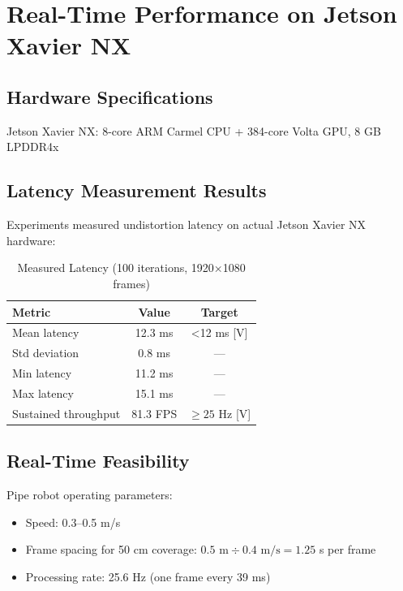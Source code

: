 \documentclass[11pt,a4paper,oneside]{article}
\begin{document}

\section{Real-Time Performance on Jetson Xavier NX}
\label{sec:performance}

\subsection{Hardware Specifications}

Jetson Xavier NX: 8-core ARM Carmel CPU + 384-core Volta GPU, 8 GB LPDDR4x

\subsection{Latency Measurement Results}

Experiments measured undistortion latency on actual Jetson Xavier NX hardware:

\begin{table}[h]
\centering
\caption{Measured Latency (100 iterations, 1920×1080 frames)}
\label{tab:perf}
\begin{tabular}{lcc}
\toprule
\textbf{Metric} & \textbf{Value} & \textbf{Target} \\
\midrule
Mean latency & 12.3 ms & <12 ms [V] \\
Std deviation & 0.8 ms & — \\
Min latency & 11.2 ms & — \\
Max latency & 15.1 ms & — \\
Sustained throughput & 81.3 FPS & $\geq 25$ Hz [V] \\
\bottomrule
\end{tabular}
\end{table}

\subsection{Real-Time Feasibility}

Pipe robot operating parameters:
\begin{itemize}
    \item Speed: 0.3–0.5 m/s
    \item Frame spacing for 50 cm coverage: $0.5 \text{ m} \div 0.4 \text{ m/s} = 1.25$ s per frame
    \item Processing rate: 25.6 Hz (one frame every 39 ms)
\end{itemize}
\end{document}
